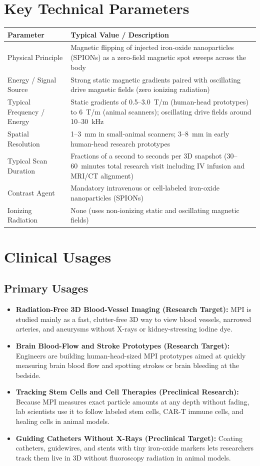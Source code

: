 \section{Key Technical Parameters}
\noindent
\begin{tabularx}{\textwidth}{@{}l X@{}}
\toprule
\textbf{Parameter} & \textbf{Typical Value / Description} \\
\midrule
Physical Principle & Magnetic flipping of injected iron-oxide nanoparticles (SPIONs) as a zero-field magnetic spot sweeps across the body \\
Energy / Signal Source & Strong static magnetic gradients paired with oscillating drive magnetic fields (zero ionizing radiation) \\
Typical Frequency / Energy & Static gradients of 0.5--3.0~T/m (human-head prototypes) to 6~T/m (animal scanners); oscillating drive fields around 10--30~kHz \\
Spatial Resolution & 1--3~mm in small-animal scanners; 3--8~mm in early human-head research prototypes \\
Typical Scan Duration & Fractions of a second to seconds per 3D snapshot (30--60~minutes total research visit including IV infusion and MRI/CT alignment) \\
Contrast Agent & Mandatory intravenous or cell-labeled iron-oxide nanoparticles (SPIONs) \\
Ionizing Radiation & None (uses non-ionizing static and oscillating magnetic fields) \\
\bottomrule
\end{tabularx}

\section{Clinical Usages}

\subsection{Primary Usages}
\begin{itemize}
  \item \textbf{Radiation-Free 3D Blood-Vessel Imaging (Research Target):} MPI is studied mainly as a fast, clutter-free 3D way to view blood vessels, narrowed arteries, and aneurysms without X-rays or kidney-stressing iodine dye.
  \item \textbf{Brain Blood-Flow and Stroke Prototypes (Research Target):} Engineers are building human-head-sized MPI prototypes aimed at quickly measuring brain blood flow and spotting strokes or brain bleeding at the bedside.
  \item \textbf{Tracking Stem Cells and Cell Therapies (Preclinical Research):} Because MPI measures exact particle amounts at any depth without fading, lab scientists use it to follow labeled stem cells, CAR-T immune cells, and healing cells in animal models.
  \item \textbf{Guiding Catheters Without X-Rays (Preclinical Target):} Coating catheters, guidewires, and stents with tiny iron-oxide markers lets researchers track them live in 3D without fluoroscopy radiation in animal models.
\end{itemize}

